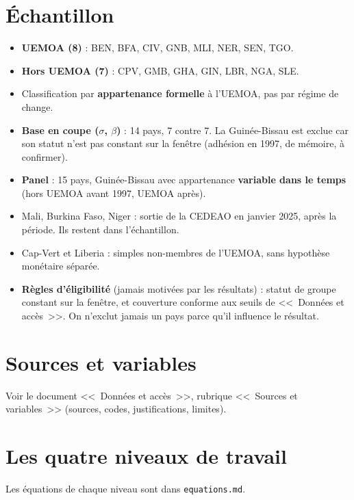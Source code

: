 \documentclass[14pt,a4paper]{article}
\newcommand{\sig}{\texorpdfstring{$\sigma$}{sigma}}
\newcommand{\bet}{\texorpdfstring{$\beta$}{beta}}
\begin{document}
	\section{Échantillon}
	
	\begin{itemize}
		\item \textbf{UEMOA (8)} : BEN, BFA, CIV, GNB, MLI, NER, SEN, TGO.
		\item \textbf{Hors UEMOA (7)} : CPV, GMB, GHA, GIN, LBR, NGA, SLE.
		\item Classification par \textbf{appartenance formelle} à l'UEMOA, pas par régime de change.
		\item \textbf{Base en coupe (\sig, \bet)} : 14 pays, 7 contre 7. La Guinée-Bissau est exclue car son statut n'est pas constant sur la fenêtre (adhésion en 1997, de mémoire, à confirmer).
		\item \textbf{Panel} : 15 pays, Guinée-Bissau avec appartenance \textbf{variable dans le temps} (hors UEMOA avant 1997, UEMOA après).
		\item Mali, Burkina Faso, Niger : sortie de la CEDEAO en janvier 2025, après la période. Ils restent dans l'échantillon.
		\item Cap-Vert et Liberia : simples non-membres de l'UEMOA, sans hypothèse monétaire séparée.
		\item \textbf{Règles d'éligibilité} (jamais motivées par les résultats) : statut de groupe constant sur la fenêtre, et couverture conforme aux seuils de <<~Données et accès~>>. On n'exclut jamais un pays parce qu'il influence le résultat.
	\end{itemize}
	
	\section{Sources et variables}
	
	Voir le document <<~Données et accès~>>, rubrique <<~Sources et variables~>> (sources, codes, justifications, limites).
	
	\section{Les quatre niveaux de travail}
	
	Les équations de chaque niveau sont dans \texttt{equations.md}.
	
\end{document}
